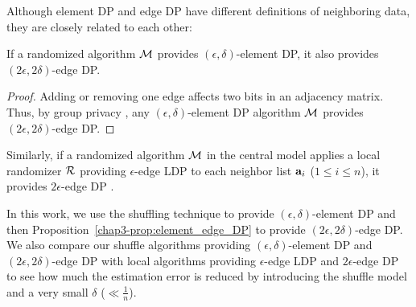 

Although element DP and edge DP have different definitions of neighboring data, they are closely related to each other:

\begin{proposition}\label{chap3-prop:element_edge_DP}
If a randomized algorithm $\mathcal{M}$ provides $(\epsilon, \delta)$-element DP, it also provides $(2\epsilon, 2\delta)$-edge DP. 
\end{proposition}
\begin{proof}
Adding or removing one edge affects two bits in an adjacency matrix. 
Thus, by group privacy \cite{DP}, any 
$(\epsilon, \delta)$-element DP 
algorithm $\mathcal{M}$ 
provides $(2\epsilon, 2\delta)$-edge DP. 
\end{proof}
Similarly, if 
a randomized algorithm $\mathcal{M}$ in the central model 
applies a local randomizer $\mathcal{R}$ providing $\epsilon$-edge LDP to each neighbor list $\mathbf{a}_i$ ($1 \leq i \leq n$), it provides $2\epsilon$-edge DP \cite{Imola_USENIX21}. 

In this work, we use the shuffling technique to provide $(\epsilon, \delta)$-element DP and then Proposition~\ref{chap3-prop:element_edge_DP} to provide $(2\epsilon, 2\delta)$-edge DP. 
We also compare our shuffle algorithms providing $(\epsilon, \delta)$-element DP and $(2\epsilon, 2\delta)$-edge DP with local algorithms providing $\epsilon$-edge LDP and $2\epsilon$-edge DP to see how much the estimation error is reduced by introducing the shuffle model and a very small $\delta$ ($\ll \frac{1}{n}$). 

